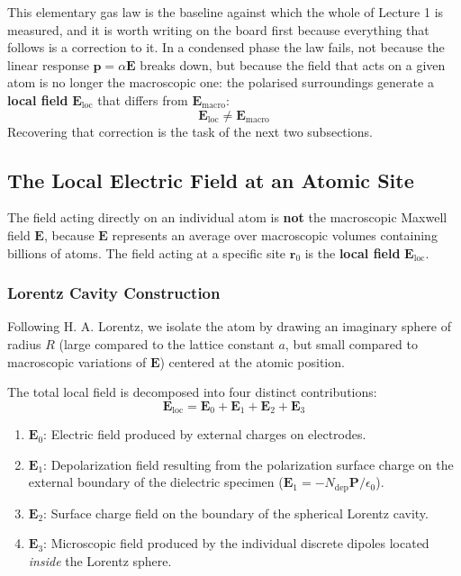 \documentclass[11pt,a4paper]{article}
\begin{document}
This elementary gas law is the baseline against which the whole of Lecture 1 is measured, and it is worth writing on the board first because everything that follows is a correction to it. In a condensed phase the law fails, not because the linear response $\mathbf{p} = \alpha\mathbf{E}$ breaks down, but because the field that acts on a given atom is no longer the macroscopic one: the polarised surroundings generate a \textbf{local field} $\mathbf{E}_{\text{loc}}$ that differs from $\mathbf{E}_{\text{macro}}$:
\begin{equation}
    \mathbf{E}_{\text{loc}} \neq \mathbf{E}_{\text{macro}}
\end{equation}
Recovering that correction is the task of the next two subsections.

\subsection{The Local Electric Field at an Atomic Site}
The field acting directly on an individual atom is \textbf{not} the macroscopic Maxwell field $\mathbf{E}$, because $\mathbf{E}$ represents an average over macroscopic volumes containing billions of atoms. The field acting at a specific site $\mathbf{r}_0$ is the \textbf{local field} $\mathbf{E}_{\text{loc}}$.

\subsubsection{Lorentz Cavity Construction}
Following H. A. Lorentz, we isolate the atom by drawing an imaginary sphere of radius $R$ (large compared to the lattice constant $a$, but small compared to macroscopic variations of $\mathbf{E}$) centered at the atomic position.

The total local field is decomposed into four distinct contributions:
\begin{equation}
    \mathbf{E}_{\text{loc}} = \mathbf{E}_0 + \mathbf{E}_1 + \mathbf{E}_2 + \mathbf{E}_3
\end{equation}
\begin{enumerate}
    \item $\mathbf{E}_0$: Electric field produced by external charges on electrodes.
    \item $\mathbf{E}_1$: Depolarization field resulting from the polarization surface charge on the external boundary of the dielectric specimen ($\mathbf{E}_1 = -N_{\text{dep}} \mathbf{P} / \epsilon_0$).
    \item $\mathbf{E}_2$: Surface charge field on the boundary of the spherical Lorentz cavity.
    \item $\mathbf{E}_3$: Microscopic field produced by the individual discrete dipoles located \textit{inside} the Lorentz sphere.
\end{enumerate}
\end{document}
